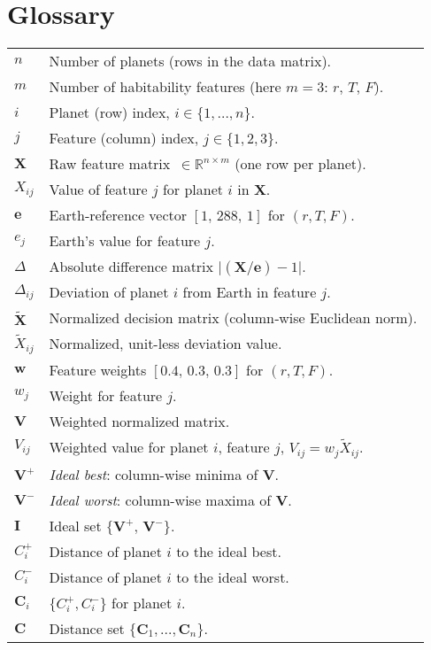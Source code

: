 \documentclass[12pt]{article}
\begin{document}
\section{Glossary}\label{sec:glossary}
\begin{tabular}{ll}
$n$ & Number of planets (rows in the data matrix).\\
$m$ & Number of habitability features (here $m=3$: $r$, $T$, $F$). \\
$i$ & Planet (row) index, $i\in\{1,\dots,n\}$. \\
$j$ & Feature (column) index, $j\in\{1,2,3\}$. \\
$\mathbf{X}$ & Raw feature matrix $\,\in\mathbb{R}^{n\times m}$ (one row per planet).\\
$X_{ij}$ & Value of feature $j$ for planet $i$ in $\mathbf{X}$.\\
$\mathbf{e}$ & Earth‐reference vector $[1,\,288,\,1]$ for $(r,T,F)$.\\
$e_j$  & Earth’s value for feature $j$.\\
$\Delta$ & Absolute difference matrix $\bigl|(\mathbf{X}/\mathbf{e})-1\bigr|$.\\
$\Delta_{ij}$ & Deviation of planet $i$ from Earth in feature $j$.\\
$\tilde{\mathbf{X}}$ & Normalized decision matrix (column‐wise Euclidean norm).\\
$\tilde{X}_{ij}$ & Normalized, unit-less deviation value.\\
$\mathbf{w}$ & Feature weights $[0.4,\,0.3,\,0.3]$ for $(r,T,F)$.\\
$w_j$ & Weight for feature $j$. \\[0.3em]
$\mathbf{V}$ & Weighted normalized matrix.\\
$V_{ij}$ & Weighted value for planet $i$, feature $j$, $V_{ij}=w_j\tilde{X}_{ij}$.\\
$\mathbf{V}^{+}$ & \emph{Ideal best}: column-wise minima of $\mathbf{V}$.\\
$\mathbf{V}^{-}$ & \emph{Ideal worst}: column-wise maxima of $\mathbf{V}$.\\
$\mathbf{I}$ & Ideal set $\{\mathbf{V}^{+},\,\mathbf{V}^{-}\}$.\\
$C_i^{+}$ & Distance of planet $i$ to the ideal best.\\
$C_i^{-}$ & Distance of planet $i$ to the ideal worst.\\
$\mathbf{C}_i$ & $\{C_i^{+},C_i^{-}\}$ for planet $i$.\\
$\mathbf{C}$ & Distance set $\{\mathbf{C}_1,\dots,\mathbf{C}_n\}$.\\

\end{tabular}
\end{document}
